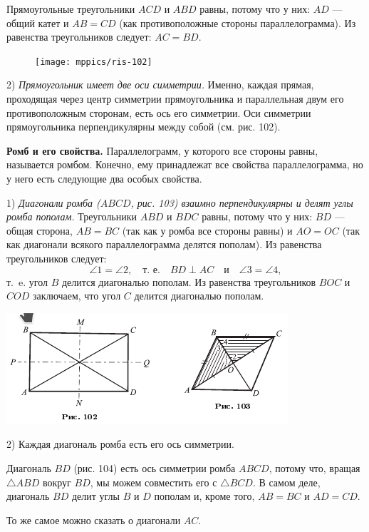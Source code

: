 \documentclass[oneside]{book}
\begin{document}
Прямоугольные треугольники $ACD$ и $ABD$ равны, потому что у них:
$AD$ — общий катет и $AB=CD$ (как противоположные стороны параллелограмма).
Из равенства треугольников следует:
$AC = BD$.

\begin{figure}
\centering
\texttt{[image: mppics/ris-102]}
\caption{}
\end{figure}

2) \emph{Прямоугольник имеет две оси симметрии.}
Именно, каждая прямая, проходящая через центр симметрии прямоугольника и параллельная двум его противоположным сторонам, есть ось его симметрии.
Оси симметрии прямоугольника перпендикулярны между собой (см. рис. 102). %

\textbf{Ромб и его свойства.}
Параллелограмм, у которого все стороны равны, называется ромбом.
Конечно, ему принадлежат все свойства параллелограмма, но у него есть следующие два особых свойства.

1) \emph{Диагонали ромба \emph{($ABCD$, рис. 103)} взаимно перпендикулярны и делят углы ромба пополам.}
Треугольники $ABD$ и $BDC$ равны, потому что у них:
$BD$ — общая сторона, $AB=BC$ (так как у ромба все стороны равны) и $AO=OC$ (так как диагонали всякого параллелограмма делятся пополам).
Из равенства треугольников следует:
\[\angle 1 =\angle 2,
\quad
\text{т.~е.}
\quad
BD\perp AC
\quad
\text{и}
\quad
\angle 3 =\angle 4,
\]
т.~e.
угол $B$ делится диагональю пополам.
Из равенства треугольников $BOC$ и $COD$ заключаем, что угол $C$ делится диагональю пополам.

\includegraphics{pics/ris-102-103}


2) Каждая диагональ ромба есть его ось симметрии.

Диагональ $BD$ (рис. 104) есть ось симметрии ромба $ABCD$, потому что, %
вращая $\triangle ABD$ вокруг $BD$, мы можем совместить его с $\triangle BCD$.
В самом деле, диагональ $BD$ делит углы $B$ и $D$ пополам и, кроме того, $AB=BC$ и $AD=CD$.

То же самое можно сказать о диагонали $AC$.
\end{document}
